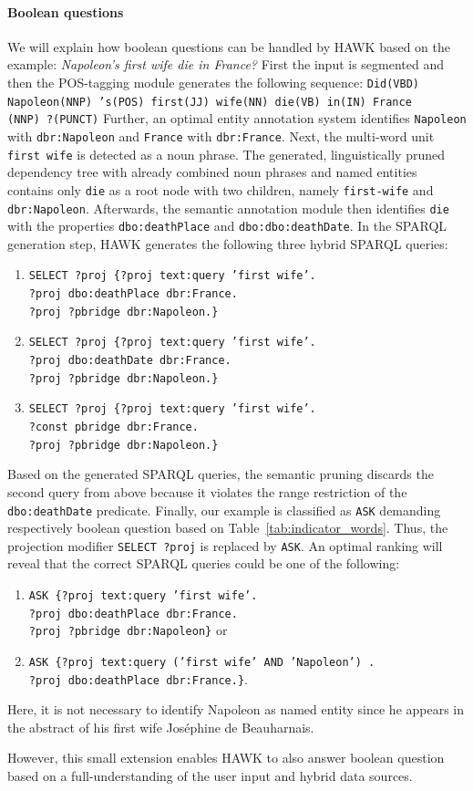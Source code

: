 \paragraph{Boolean questions} We will explain how boolean questions can be handled by HAWK based on the example: \emph{Napoleon's first wife die in France?}
First the input is segmented and then the POS-tagging module generates the following sequence: \texttt{Did(VBD) Napoleon(NNP) 's(POS) first(JJ) wife(NN) die(VB) in(IN) France\\(NNP) ?(PUNCT)}
Further, an optimal entity annotation system identifies \texttt{Napoleon} with \texttt{dbr:Napoleon} and \texttt{France} with \texttt{dbr:France}.
Next, the multi-word unit \texttt{first wife} is detected as a noun phrase.
The generated, linguistically pruned dependency tree with already combined noun phrases and named entities contains only \texttt{die} as a root node with two children, namely \texttt{first-wife} and \texttt{dbr:Napoleon}.
Afterwards, the semantic annotation module then identifies \texttt{die} with the properties \texttt{dbo:deathPlace} and \texttt{dbo:dbo:deathDate}.
In the SPARQL generation step, HAWK generates the following three hybrid SPARQL queries:
\begin{enumerate}
\item \texttt{SELECT ?proj  \{?proj text:query 'first wife'.\\ ?proj dbo:deathPlace dbr:France.\\ ?proj ?pbridge dbr:Napoleon.\}}
\item \texttt{SELECT ?proj  \{?proj text:query 'first wife'.\\ ?proj dbo:deathDate dbr:France.\\ ?proj ?pbridge dbr:Napoleon.\}}
\item \texttt{SELECT ?proj  \{?proj text:query 'first wife'.\\ ?const pbridge dbr:France.\\ ?proj ?pbridge dbr:Napoleon.\}}
\end{enumerate}
Based on the generated SPARQL queries, the semantic pruning discards the second query from above because it violates the range restriction of the \texttt{dbo:deathDate} predicate.
Finally, our  example is classified as \texttt{ASK} demanding respectively boolean question based on Table~\ref{tab:indicator_words}.
Thus, the projection modifier \texttt{SELECT ?proj} is replaced by \texttt{ASK}.
An optimal ranking will reveal that the correct SPARQL queries could be one of the following:
\begin{enumerate}
\item \texttt{ASK \{?proj text:query 'first wife'. \\?proj dbo:deathPlace dbr:France. \\?proj ?pbridge dbr:Napoleon\}} or 
\item \texttt{ASK \{?proj text:query ('first wife' AND 'Napoleon') .\\ ?proj dbo:deathPlace dbr:France.\}}.
\end{enumerate} 
Here, it is not necessary to identify Napoleon as named entity since he appears in the abstract of his first wife Joséphine de Beauharnais.

However, this small extension enables HAWK to also answer boolean question based on a full-understanding of the user input and hybrid data sources.